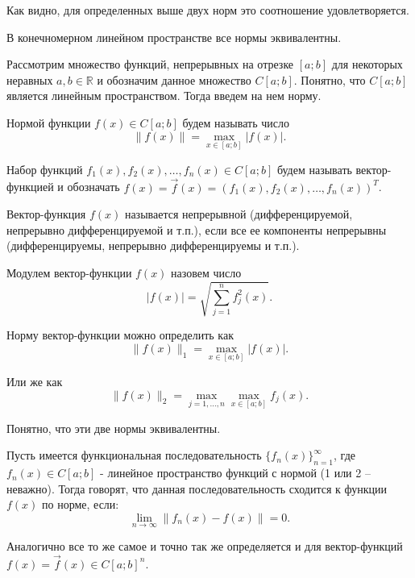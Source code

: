 	Как видно, для определенных выше двух норм это соотношение удовлетворяется.
	
	\begin{proposition}
		В конечномерном линейном пространстве все нормы эквивалентны.
	\end{proposition}

	Рассмотрим множество функций, непрерывных на отрезке $[a; b]$ для некоторых неравных $a, b \in \mathbb{R}$ и обозначим данное множество $C[a; b]$. Понятно, что $C[a; b]$ является линейным пространством. Тогда введем на нем норму.
	
	\begin{definition}
		Нормой функции $f(x) \in C[a; b]$ будем называть число $$\|f(x)\| = \max_{x \in [a; b]}|f(x)|.$$
	\end{definition}

	\begin{definition}
		Набор функций $f_1(x), f_2(x), \dots, f_n(x) \in C[a; b]$ будем называть вектор-функцией и обозначать $f(x) = \vec{f}(x) = \left(f_1(x), f_2(x), \dots, f_n(x)\right)^T$.
	\end{definition}

	\begin{definition}
		Вектор-функция $f(x)$ называется непрерывной (дифференцируемой, непрерывно дифференцируемой и т.п.), если все ее компоненты непрерывны (дифференцируемы, непрерывно дифференцируемы и т.п.).
	\end{definition}

	\begin{definition}
		Модулем вектор-функции $f(x)$ назовем число
		\begin{equation*}
			|f(x)| = \sqrt{\sum_{j = 1}^{n} f_j^2(x) }.
		\end{equation*}
	\end{definition}

	Норму вектор-функции можно определить как $$\|f(x)\|_1 = \max_{x \in [a; b]}|f(x)|.$$
	
	Или же как $$\|f(x)\|_2 = \max_{j = 1, \dots, n} \max_{x \in [a; b]} f_j(x).$$
	
	Понятно, что эти две нормы эквивалентны.
	
	\begin{definition}
		Пусть имеется функциональная последовательность $\{f_n(x)\}_{n = 1}^{\infty}$, где $f_n(x) \in C[a; b]$ - линейное пространство функций с нормой (1 или 2 -- неважно). Тогда говорят, что данная последовательность сходится к функции $f(x)$ по норме, если:
		\begin{equation*}
			\lim\limits_{n\rightarrow \infty} \|f_n(x) - f(x)\| = 0.
		\end{equation*}
	
	Аналогично все то же самое и точно так же определяется и для вектор-функций $f(x) = \vec{f}(x) \in C[a; b]^n$.
	\end{definition}

